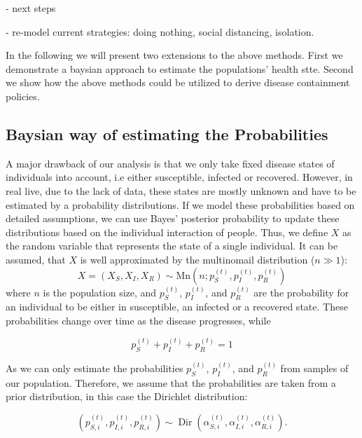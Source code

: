 - next steps

- re-model current strategies: doing nothing, social distancing, isolation.

In the following we will present two extensions to the above methods.
First we demonstrate a baysian approach to estimate the populations' health stte.
Second we show how the above methods could be utilized to derive disease containment policies.

\subsection{Baysian way of estimating the Probabilities}

A major drawback of our analysis is that we only take fixed disease states of individuals into account, i.e either susceptible, infected or recovered. However, in real live, due to the lack of data, these states are mostly unknown and have to be estimated by a probability distributions. If we model these probabilities based on detailed assumptions, we can use Bayes' posterior probability to update these distributions based on the individual interaction of people. Thus, we define $X$ as the random variable that represents the state of a single individual. It can be assumed, that $X$ is well approximated by the multinomail distribution ($n\gg1$):
\begin{equation}
    X = \left(X_{S}, X_{I}, X_{R}\right) \sim \text{Mn}(n;p_S^{(t)},p_I^{(t)},p_R^{(t)})
\end{equation}
where $n$ is the population size, and $p_S^{(t)}$, $p_I^{(t)}$, and $p_R^{(t)}$ are the probability for an individual to be either in susceptible, an infected or a recovered state. These probabilities change over time as the disease progresses, while

\begin{equation}
    p_S^{(t)}+p_I^{(t)}+p_R^{(t)}=1
\end{equation}

As we can only estimate the probabilities $p_S^{(t)}$, $p_I^{(t)}$, and $p_R^{(t)}$ from samples of our population. Therefore, we assume that the probabilities are taken from a prior distribution, in this case the Dirichlet distribution:

\begin{equation}
    \left(p_{S,i}^{(t)}, p_{I,i}^{(t)}, p_{R,i}^{(t)}\right) \sim \operatorname{Dir}\left(\alpha_{S,i}^{(t)}, \alpha_{I,i}^{(t)}, \alpha_{R,i}^{(t)}\right).
\end{equation}

